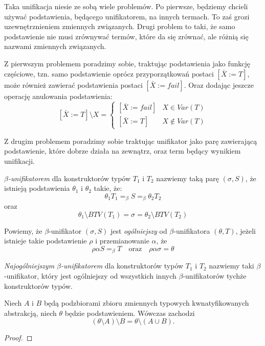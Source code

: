 \documentclass[11pt,leqno]{article}
\begin{document}
Taka unifikacja niesie ze sobą wiele problemów. Po pierwsze, będziemy chcieli używać podstawienia,
będącego unifikatorem, na innych termach. To zaś grozi uzewnętrznieniem zmiennych związanych. Drugi
problem to taki, że samo podstawienie nie musi zrównywać termów, które da się zrównać, ale różnią się
nazwami zmiennych związanych.

Z pierwszym problemem poradzimy sobie, traktując podstawienia jako funkcję częściowe, tzn. samo podstawienie
oprócz przyporzątkowań postaci $[\bar{X} := T]$, może również zawierać podstawienia postaci $[\bar{X} := fail]$.
Oraz dodając jeszcze operację anulowania podstawienia:
\[
[\bar{X} := T] \setminus X = 
\begin{cases}
[\bar{X} := fail] & X \in    Var(T) \\
[\bar{X} := T]    & X \notin Var(T)
\end{cases}
\]

Z drugim problemem poradzimy sobie traktując unifikator jako parę zawierającą podstawienie, które dobrze działa
na zewnątrz, oraz term będący wynikiem unifikacji.

\begin{definicja}
\emph{$\beta$-unifikatorem} dla konstruktorów typów $T_1$ i $T_2$ nazwiemy taką parę $(\sigma, S)$, że istnieją
podstawienia $\theta_1$ i $\theta_2$ takie, że:
\[
\theta_1 T_1 =_\beta S =_\beta \theta_2 T_2
\]
oraz
\[
\theta_1 \setminus BTV(T_1) = \sigma = \theta_2 \setminus BTV(T_2)
\]
\end{definicja}

\begin{definicja}
Powiemy, że $\beta$-unifikator $(\sigma, S)$ jest \emph{ogólniejszy} od $\beta$-unifikatora
$(\theta, T)$, jeżeli istnieje takie podstawienie $\rho$ i przemianowanie $\alpha$, że
\[
\rho\alpha S =_\beta T \quad \textrm{oraz} \quad \rho\alpha\sigma = \theta
\]
\end{definicja}

\begin{definicja}
\emph{Najogólniejszym $\beta$-unifikatorem} dla konstruktorów typów $T_1$ i $T_2$ nazwiemy taki $\beta$-unifikator,
który jest ogólniejszy od wszystkich innych $\beta$-unifikatorów tychże konstruktorów typów.
\end{definicja}

\begin{lemat}
Niech $A$ i $B$ będą podzbiorami zbioru zmiennych typowych kwnatyfikowanych abstrakcją, niech $\theta$ będzie podstawieniem.
Wówczas zachodzi
\[
(\theta \setminus A) \setminus B = \theta \setminus (A \cup B).
\]
\label{lsub0}
\end{lemat}
\begin{proof}
\end{proof}
\end{document}
